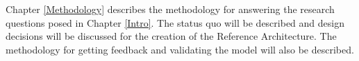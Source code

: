 Chapter \ref{Methodology} describes the methodology for answering the research questions posed in Chapter \ref{Intro}. The status quo will be described and design decisions will be discussed for the creation of the Reference Architecture. The methodology for getting feedback and validating the model will also be described. 





